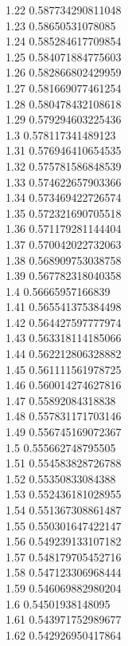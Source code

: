 {1.22	0.587734290811048\\
1.23	0.58650531078085\\
1.24	0.585284617709854\\
1.25	0.584071884775603\\
1.26	0.582866802429959\\
1.27	0.581669077461254\\
1.28	0.580478432108618\\
1.29	0.579294603225436\\
1.3	0.578117341489123\\
1.31	0.576946410654535\\
1.32	0.575781586848539\\
1.33	0.574622657903366\\
1.34	0.573469422726574\\
1.35	0.572321690705518\\
1.36	0.571179281144404\\
1.37	0.570042022732063\\
1.38	0.568909753038758\\
1.39	0.567782318040358\\
1.4	0.56665957166839\\
1.41	0.565541375384498\\
1.42	0.564427597777974\\
1.43	0.563318114185066\\
1.44	0.562212806328882\\
1.45	0.561111561978725\\
1.46	0.560014274627816\\
1.47	0.55892084318838\\
1.48	0.557831171703146\\
1.49	0.556745169072367\\
1.5	0.555662748795505\\
1.51	0.554583828726788\\
1.52	0.55350833084388\\
1.53	0.552436181028955\\
1.54	0.551367308861487\\
1.55	0.550301647422147\\
1.56	0.549239133107182\\
1.57	0.548179705452716\\
1.58	0.547123306968444\\
1.59	0.546069882980204\\
1.6	0.54501938148095\\
1.61	0.543971752989677\\
1.62	0.542926950417864\\
}
